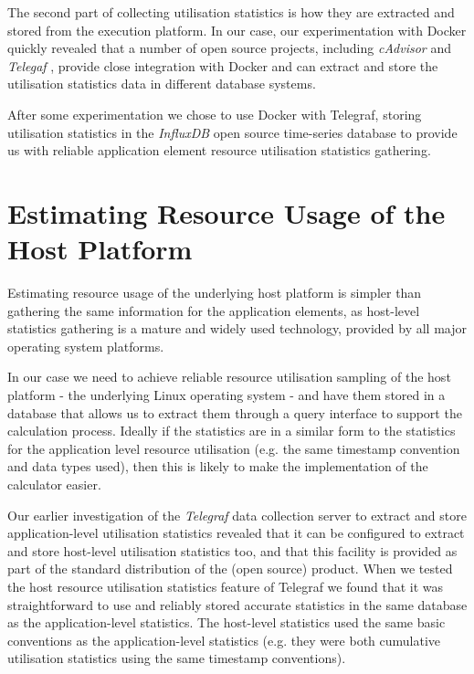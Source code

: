 The second part of collecting utilisation statistics is how they are extracted and stored from the execution platform.  In our case, our experimentation with Docker quickly revealed that a number of open source projects, including \emph{cAdvisor} \cite{cadvisor2018} and \emph{Telegaf} \cite{telegraf2018}, provide close integration with Docker and can extract and store the utilisation statistics data in different database systems.

After some experimentation we chose to use Docker with Telegraf, storing utilisation statistics in the \emph{InfluxDB} \cite{influxdb2018} open source time-series database to provide us with reliable application element resource utilisation statistics gathering.

\section{Estimating Resource Usage of the Host Platform}

Estimating resource usage of the underlying host platform is simpler than gathering the same information for the application elements, as host-level statistics gathering is a mature and widely used technology, provided by all major operating system platforms.

In our case we need to achieve reliable resource utilisation sampling of the host platform - the underlying Linux operating system - and have them stored in a database that allows us to extract them through a query interface to support the calculation process.  Ideally if the statistics are in a similar form to the statistics for the application level resource utilisation (e.g. the same timestamp convention and data types used), then this is likely to make the implementation of the calculator easier.

Our earlier investigation of the \emph{Telegraf} data collection server to extract and store application-level utilisation statistics revealed that it can be configured to extract and store host-level utilisation statistics too, and that this facility is provided as part of the standard distribution of the (open source) product.  When we tested the host resource utilisation statistics feature of Telegraf we found that it was straightforward to use and reliably stored accurate statistics in the same database as the application-level statistics.  The host-level statistics used the same basic conventions as the application-level statistics (e.g. they were both cumulative utilisation statistics using the same timestamp conventions).

